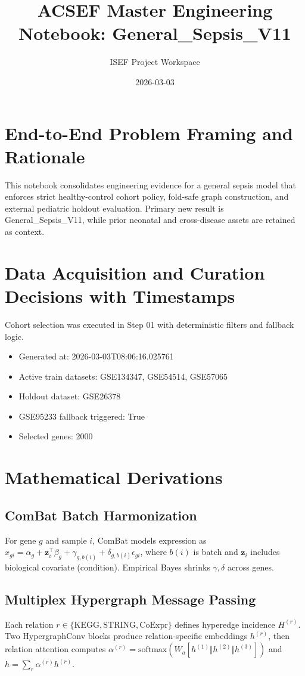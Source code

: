 \documentclass[11pt]{article}
\title{ACSEF Master Engineering Notebook: General\_Sepsis\_V11}
\author{ISEF Project Workspace}
\date{2026-03-03}
\begin{document}
\maketitle
\tableofcontents
\newpage
\section{End-to-End Problem Framing and Rationale}
This notebook consolidates engineering evidence for a general sepsis model that enforces strict healthy-control cohort policy, fold-safe graph construction, and external pediatric holdout evaluation. Primary new result is General\_Sepsis\_V11, while prior neonatal and cross-disease assets are retained as context.
\section{Data Acquisition and Curation Decisions with Timestamps}
Cohort selection was executed in Step 01 with deterministic filters and fallback logic.
\begin{itemize}
\item Generated at: 2026-03-03T08:06:16.025761
\item Active train datasets: GSE134347, GSE54514, GSE57065
\item Holdout dataset: GSE26378
\item GSE95233 fallback triggered: True
\item Selected genes: 2000
\end{itemize}
\section{Mathematical Derivations}
\subsection{ComBat Batch Harmonization}
For gene $g$ and sample $i$, ComBat models expression as $x_{gi} = \alpha_g + \mathbf{z}_i^\top\beta_g + \gamma_{g,b(i)} + \delta_{g,b(i)}\epsilon_{gi}$, where $b(i)$ is batch and $\mathbf{z}_i$ includes biological covariate (condition). Empirical Bayes shrinks $\gamma,\delta$ across genes.
\subsection{Multiplex Hypergraph Message Passing}
Each relation $r \in \{\mathrm{KEGG},\mathrm{STRING},\mathrm{CoExpr}\}$ defines hyperedge incidence $H^{(r)}$. Two HypergraphConv blocks produce relation-specific embeddings $h^{(r)}$, then relation attention computes $\alpha^{(r)} = \mathrm{softmax}(W_a[h^{(1)}\Vert h^{(2)}\Vert h^{(3)}])$ and $h = \sum_r \alpha^{(r)} h^{(r)}$.
\end{document}

